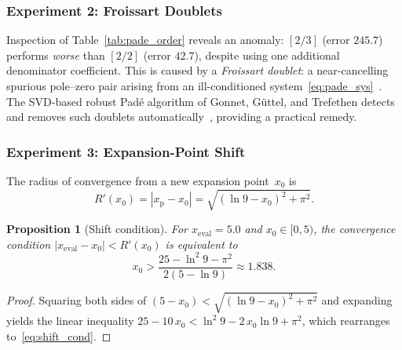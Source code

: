 \documentclass[12pt,a4paper]{article}
\newtheorem{proposition}[theorem]{Proposition}
\theoremstyle{definition}
\theoremstyle{remark}
\newcommand{\xp}{x_{\mathrm{p}}}
\newcommand{\abs}[1]{\left\lvert #1 \right\rvert}
\begin{document}
\subsubsection{Experiment 2: Froissart Doublets}

Inspection of Table~\ref{tab:pade_order} reveals an anomaly:
$[2/3]$ (error $245.7$) performs \emph{worse} than $[2/2]$
(error $42.7$), despite using one additional denominator coefficient.
This is caused by a \emph{Froissart doublet}: a near-cancelling
spurious pole--zero pair arising from an ill-conditioned
system~\eqref{eq:pade_sys}~\cite{gonnet2013}.  The SVD-based
robust Padé algorithm of Gonnet, Güttel, and Trefethen detects and
removes such doublets automatically~\cite{gonnet2013}, providing a
practical remedy.

\subsubsection{Experiment 3: Expansion-Point Shift}
\label{sec:shift}

The radius of convergence from a new expansion point~$x_0$ is
\begin{equation}
  R'(x_0) = \abs{\xp - x_0}
  = \sqrt{(\ln 9 - x_0)^2 + \pi^2}.
  \label{eq:Rprime}
\end{equation}

\begin{proposition}[Shift condition]
  \label{prop:shift}
  For $x_{\mathrm{eval}} = 5.0$ and $x_0 \in [0, 5)$, the
  convergence condition $|x_{\mathrm{eval}} - x_0| < R'(x_0)$ is
  equivalent to
  \begin{equation}
    x_0 > \frac{25 - \ln^2 9 - \pi^2}{2(5 - \ln 9)}
    \approx 1.838.
    \label{eq:shift_cond}
  \end{equation}
\end{proposition}

\begin{proof}
  Squaring both sides of $(5 - x_0) < \sqrt{(\ln 9 - x_0)^2 + \pi^2}$
  and expanding yields the linear inequality
  $25 - 10\,x_0 < \ln^2 9 - 2\,x_0 \ln 9 + \pi^2$, which
  rearranges to~\eqref{eq:shift_cond}.
\end{proof}
\end{document}
